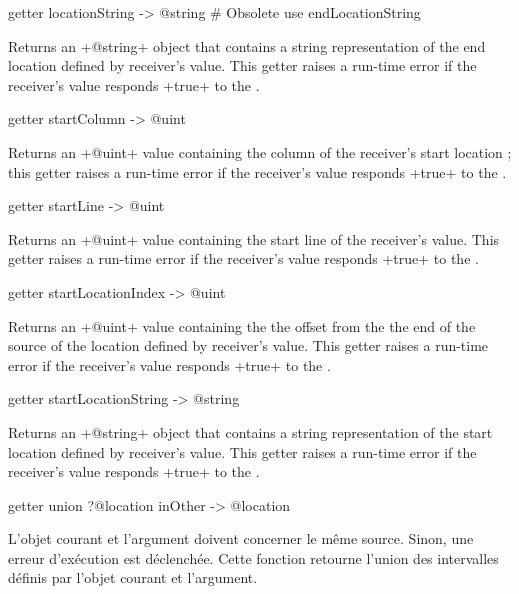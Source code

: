 
\begin{galgas}
getter locationString -> @string # Obsolete use endLocationString
\end{galgas}

Returns an \ggs+@string+ object that contains a string representation of the end location defined by receiver's value. This getter raises a run-time error if the receiver's value responds \ggs+true+ to the .




\begin{galgas}
getter startColumn -> @uint
\end{galgas}

Returns an \ggs+@uint+ value containing the column of the receiver's start location ; this getter raises a run-time error if the receiver's value responds \ggs+true+ to the .



\begin{galgas}
getter startLine -> @uint
\end{galgas}

Returns an \ggs+@uint+ value containing the start line of the receiver's value. This getter raises a run-time error if the receiver's value responds \ggs+true+ to the .




\begin{galgas}
getter startLocationIndex -> @uint
\end{galgas}

Returns an \ggs+@uint+ value containing the the offset from the the end of the source of the location defined by receiver's value. This getter raises a run-time error if the receiver's value responds \ggs+true+ to the .



\begin{galgas}
getter startLocationString -> @string
\end{galgas}


Returns an \ggs+@string+ object that contains a string representation of the start location defined by receiver's value. This getter raises a run-time error if the receiver's value responds \ggs+true+ to the .



\begin{galgas}
getter union ?@location inOther -> @location
\end{galgas}

L'objet courant et l'argument doivent concerner le même source. Sinon, une erreur d'exécution est déclenchée. Cette fonction retourne l'union des intervalles définis par l'objet courant et l'argument. 

